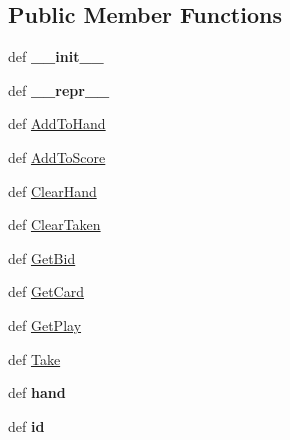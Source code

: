 \subsection*{Public Member Functions}
\begin{DoxyCompactItemize}
\item 
\hypertarget{classcards-with-friends_1_1player_1_1_player_a870653b97184fdf2b3d280335ad85a75}{def {\bfseries \-\_\-\-\_\-init\-\_\-\-\_\-}}\label{classcards-with-friends_1_1player_1_1_player_a870653b97184fdf2b3d280335ad85a75}

\item 
\hypertarget{classcards-with-friends_1_1player_1_1_player_ac7883932b882c801acba1fa20e82823f}{def {\bfseries \-\_\-\-\_\-repr\-\_\-\-\_\-}}\label{classcards-with-friends_1_1player_1_1_player_ac7883932b882c801acba1fa20e82823f}

\item 
def \hyperlink{classcards-with-friends_1_1player_1_1_player_aca27cc9aa97308913c5c3bab950337c9}{Add\-To\-Hand}
\item 
def \hyperlink{classcards-with-friends_1_1player_1_1_player_a76f414d3f246dbbe773a68b3f97406c3}{Add\-To\-Score}
\item 
def \hyperlink{classcards-with-friends_1_1player_1_1_player_a0942a5cfb0e6b67ba4fa865d1702136f}{Clear\-Hand}
\item 
def \hyperlink{classcards-with-friends_1_1player_1_1_player_aaee086f5336082c54312ddaea1b3fb32}{Clear\-Taken}
\item 
def \hyperlink{classcards-with-friends_1_1player_1_1_player_a2351ccc580354631fe7c54afdf1dae6e}{Get\-Bid}
\item 
def \hyperlink{classcards-with-friends_1_1player_1_1_player_a1aba66f48fc2a1f4b6f8e1720ee0ea7f}{Get\-Card}
\item 
def \hyperlink{classcards-with-friends_1_1player_1_1_player_a20ab5c7ed6517c5f325e1c34cfe23099}{Get\-Play}
\item 
def \hyperlink{classcards-with-friends_1_1player_1_1_player_ac43a65d18da6ad2a8b0b75bbce9b85f5}{Take}
\item 
\hypertarget{classcards-with-friends_1_1player_1_1_player_a88b7d8119bcf2e7e18c2a3539e5ea1bd}{def {\bfseries hand}}\label{classcards-with-friends_1_1player_1_1_player_a88b7d8119bcf2e7e18c2a3539e5ea1bd}

\item 
\hypertarget{classcards-with-friends_1_1player_1_1_player_aec146f8e7a9c6323dc39b3dd21b63e9a}{def {\bfseries id}}\label{classcards-with-friends_1_1player_1_1_player_aec146f8e7a9c6323dc39b3dd21b63e9a}


\end{DoxyCompactItemize}
